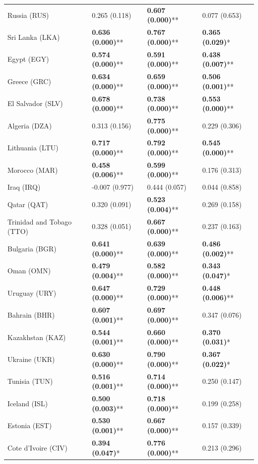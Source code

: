 \begin{longtable}{p{4cm}p{3cm}p{3cm}p{3cm}}
Russia (RUS) & 0.265 (0.118) & \textbf{0.607 (0.000)}** & 0.077 (0.653) \\
Sri Lanka (LKA) & \textbf{0.636 (0.000)}** & \textbf{0.767 (0.000)}** & \textbf{0.365 (0.029)}* \\
Egypt (EGY) & \textbf{0.574 (0.000)}** & \textbf{0.591 (0.000)}** & \textbf{0.438 (0.007)}** \\
Greece (GRC) & \textbf{0.634 (0.000)}** & \textbf{0.659 (0.000)}** & \textbf{0.506 (0.001)}** \\
El Salvador (SLV) & \textbf{0.678 (0.000)}** & \textbf{0.738 (0.000)}** & \textbf{0.553 (0.000)}** \\
Algeria (DZA) & 0.313 (0.156) & \textbf{0.775 (0.000)}** & 0.229 (0.306) \\
Lithuania (LTU) & \textbf{0.717 (0.000)}** & \textbf{0.792 (0.000)}** & \textbf{0.545 (0.000)}** \\
Morocco (MAR) & \textbf{0.458 (0.006)}** & \textbf{0.599 (0.000)}** & 0.176 (0.313) \\
Iraq (IRQ) & -0.007 (0.977) & 0.444 (0.057) & 0.044 (0.858) \\
Qatar (QAT) & 0.320 (0.091) & \textbf{0.523 (0.004)}** & 0.269 (0.158) \\
Trinidad and Tobago (TTO) & 0.328 (0.051) & \textbf{0.667 (0.000)}** & 0.237 (0.163) \\
Bulgaria (BGR) & \textbf{0.641 (0.000)}** & \textbf{0.639 (0.000)}** & \textbf{0.486 (0.002)}** \\
Oman (OMN) & \textbf{0.479 (0.004)}** & \textbf{0.582 (0.000)}** & \textbf{0.343 (0.047)}* \\
Uruguay (URY) & \textbf{0.647 (0.000)}** & \textbf{0.729 (0.000)}** & \textbf{0.448 (0.006)}** \\
Bahrain (BHR) & \textbf{0.607 (0.001)}** & \textbf{0.697 (0.000)}** & 0.347 (0.076) \\
Kazakhstan (KAZ) & \textbf{0.544 (0.001)}** & \textbf{0.660 (0.000)}** & \textbf{0.370 (0.031)}* \\
Ukraine (UKR) & \textbf{0.630 (0.000)}** & \textbf{0.790 (0.000)}** & \textbf{0.367 (0.022)}* \\
Tunisia (TUN) & \textbf{0.516 (0.001)}** & \textbf{0.714 (0.000)}** & 0.250 (0.147) \\
Iceland (ISL) & \textbf{0.500 (0.003)}** & \textbf{0.718 (0.000)}** & 0.199 (0.258) \\
Estonia (EST) & \textbf{0.530 (0.001)}** & \textbf{0.667 (0.000)}** & 0.157 (0.339) \\
Cote d'Ivoire (CIV) & \textbf{0.394 (0.047)}* & \textbf{0.776 (0.000)}** & 0.213 (0.296) \\

\end{longtable}
